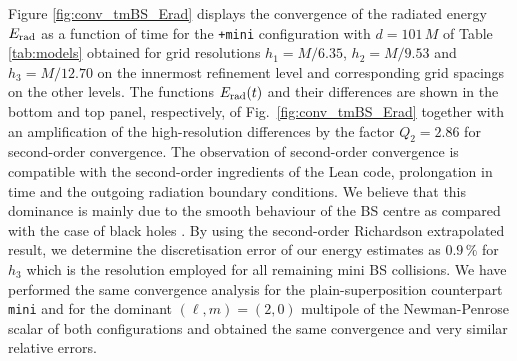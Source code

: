 \documentclass[]{iopart}
\newcommand{\us}[1]{\textcolor{teal}{[{\it\textbf{US: #1}}]} }
\begin{document}
Figure \ref{fig:conv_tmBS_Erad} displays the convergence
of the radiated energy $E_{\rm rad}$ as a function
of time for the {\tt +mini} configuration with $d=101\,M$ of
Table \ref{tab:models} obtained for grid resolutions
$h_1=M/6.35$, $h_2=M/9.53$ and $h_3=M/12.70$ on the
innermost refinement level and corresponding grid 
spacings on the other levels. The functions
$E_{\rm rad}(t)$ and their differences are shown in the
bottom and top panel, respectively, of Fig.~\ref{fig:conv_tmBS_Erad}
together with an amplification of the high-resolution
differences by the factor $Q_2=2.86$ for second-order
convergence. The observation of second-order convergence
is compatible with the second-order ingredients of the
{\sc Lean} code, prolongation in time and the outgoing
radiation boundary conditions. We believe that this
dominance is mainly due to the smooth behaviour
of the BS centre as compared with the case of black holes
\cite{Husa:2007hp}. By using the second-order
Richardson extrapolated result, we determine the
discretisation error of our energy estimates as
$0.9\,\%$ for $h_3$ which is the resolution employed
for all remaining mini BS collisions. We have performed
the same convergence analysis for the plain-superposition
counterpart {\tt mini} and for the dominant $(\ell,m)=(2,0)$
multipole of the Newman-Penrose scalar of both configurations
and obtained the same convergence and very similar relative
errors.
%
%
\end{document}
